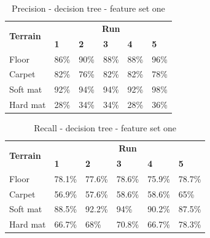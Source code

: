 \documentclass[USenglish]{ifimaster}  %
\begin{document}
\begin{table}[h]
	\begin{subtable}[h]{1\textwidth}
		\centering
		\captionsetup{justification=centering}
			\begin{tabular}{@{}llllll@{}}
			\toprule
			\multirow{2}{*}{\textbf{Terrain}} & \multicolumn{5}{c}{\textbf{Run}} \\ \cmidrule(l){2-6} 
			& \multicolumn{1}{l|}{\textbf{1}} & \multicolumn{1}{l|}{\textbf{2}} & \multicolumn{1}{l|}{\textbf{3}} & \multicolumn{1}{l|}{\textbf{4}} & \textbf{5} \\ \midrule
			\multicolumn{1}{l|}{Floor} & \multicolumn{1}{l|}{86\%} & \multicolumn{1}{l|}{90\%} & \multicolumn{1}{l|}{88\%} & \multicolumn{1}{l|}{88\%} & 96\% \\ \midrule
			\multicolumn{1}{l|}{Carpet} & \multicolumn{1}{l|}{82\%} & \multicolumn{1}{l|}{76\%} & \multicolumn{1}{l|}{82\%} & \multicolumn{1}{l|}{82\%} & 78\% \\ \midrule
			\multicolumn{1}{l|}{Soft mat} & \multicolumn{1}{l|}{92\%} & \multicolumn{1}{l|}{94\%} & \multicolumn{1}{l|}{94\%} & \multicolumn{1}{l|}{92\%} & 98\% \\ \midrule
			\multicolumn{1}{l|}{Hard mat} & \multicolumn{1}{l|}{28\%} & \multicolumn{1}{l|}{34\%} & \multicolumn{1}{l|}{34\%} & \multicolumn{1}{l|}{28\%} & 36\% \\ \bottomrule
		\end{tabular}
		\caption{Precision - decision tree - feature set one}
		\label{dt1Precision}
	\end{subtable}
\end{table}
\hfill
\begin{table}[h]\ContinuedFloat
	\begin{subtable}[h]{1\textwidth}
		\centering
		\captionsetup{justification=centering}
		\begin{tabular}{@{}llllll@{}}
			\toprule
			\multirow{2}{*}{\textbf{Terrain}} & \multicolumn{5}{c}{\textbf{Run}} \\ \cmidrule(l){2-6} 
			& \multicolumn{1}{l|}{\textbf{1}} & \multicolumn{1}{l|}{\textbf{2}} & \multicolumn{1}{l|}{\textbf{3}} & \multicolumn{1}{l|}{\textbf{4}} & \textbf{5} \\ \midrule
			\multicolumn{1}{l|}{Floor} & \multicolumn{1}{l|}{78.1\%} & \multicolumn{1}{l|}{77.6\%} & \multicolumn{1}{l|}{78.6\%} & \multicolumn{1}{l|}{75.9\%} & 78.7\% \\ \midrule
			\multicolumn{1}{l|}{Carpet} & \multicolumn{1}{l|}{56.9\%} & \multicolumn{1}{l|}{57.6\%} & \multicolumn{1}{l|}{58.6\%} & \multicolumn{1}{l|}{58.6\%} & 65\% \\ \midrule
			\multicolumn{1}{l|}{Soft mat} & \multicolumn{1}{l|}{88.5\%} & \multicolumn{1}{l|}{92.2\%} & \multicolumn{1}{l|}{94\%} & \multicolumn{1}{l|}{90.2\%} & 87.5\% \\ \midrule
			\multicolumn{1}{l|}{Hard mat} & \multicolumn{1}{l|}{66.7\%} & \multicolumn{1}{l|}{68\%} & \multicolumn{1}{l|}{70.8\%} & \multicolumn{1}{l|}{66.7\%} & 78.3\% \\ \bottomrule
		\end{tabular}
		\caption{Recall - decision tree - feature set one}
		\label{dt1recall}
	\end{subtable}
\end{table}
\end{document}
